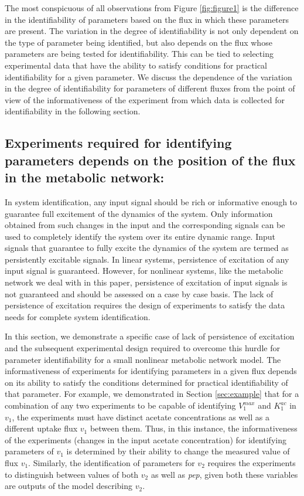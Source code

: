 \documentclass[10pt]{article}
\begin{document}
The most conspicuous of all observations from Figure \ref{fig:figure1} is the difference in the identifiability of parameters based on the flux in which these parameters are present. The variation in the degree of identifiability is not only dependent on the type of parameter being identified, but also depends on the  flux whose parameters are being tested for identifiability. This can be tied to selecting experimental data that have the ability to satisfy conditions for practical identifiability for a given parameter. We discuss the dependence of the variation in the degree of identifiability for parameters of different fluxes from the point of view of the informativeness of the experiment from which data is collected for identifiability in the following section.

\subsection{Experiments required for identifying parameters depends on the position of the flux in the metabolic network:}\label{sec:experiment_type}
In system identification, any input signal should be rich or informative enough to guarantee full excitement of the dynamics of the system. Only information obtained from such changes in the input and the corresponding signals can be used to completely identify the system over its entire dynamic range. Input signals that guarantee to fully excite the dynamics of the system are termed as persistently excitable signals. In linear systems, persistence of excitation of any input signal is guaranteed. However, for nonlinear systems, like the metabolic network we deal with in this paper, persistence of excitation of input signals is not guaranteed and should be assessed on a case by case basis. The lack of persistence of excitation requires the design of experiments to satisfy the data needs for complete system identification. 

In this section, we demonstrate a specific case of lack of persistence of excitation and the subsequent experimental design required to overcome this hurdle for parameter identifiability for a small nonlinear metabolic network model. The informativeness of experiments for identifying parameters in a given flux depends on its ability to satisfy the conditions determined for practical identifiability of that parameter. For example, we demonstrated in Section \ref{sec:example} that for a combination of any two experiments to be capable of identifying $V_1^{max}$ and $K_1^{ac}$ in $v_1$, the experiments must have distinct acetate concentrations as well as a different uptake flux $v_1$ between them. Thus, in this instance, the informativeness of the experiments (changes in the input acetate concentration) for identifying parameters of $v_1$ is determined by their ability to change the measured value of flux $v_1$. Similarly, the identification of parameters for $v_2$ requires the experiments to distinguish between values of both $v_2$ as well as \textit{pep}, given both these variables are outputs of the model describing $v_2$. 
\end{document}
